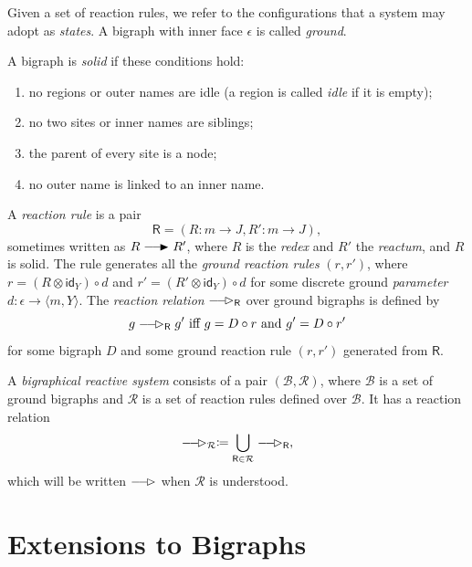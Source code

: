 \documentclass[runningheads]{llncs}
\newcommand\id{\mathsf{id}}
\providecommand\longrightarrowRHD{\relbar\joinrel\relbar\joinrel\mathrel\RHD}
\providecommand\longrightarrowrhd{\relbar\joinrel\relbar\joinrel\mathrel\rhd}
\begin{document}
Given a set of reaction rules, we refer to the configurations that a system may
adopt as \emph{states}. A bigraph with inner face $\epsilon$ is called
\emph{ground}.

\begin{definition}
  A bigraph is \emph{solid} if these conditions hold:
  \begin{enumerate}
  \item no regions or outer names are idle (a region is called \emph{idle}
    if it is empty);
  \item no two sites or inner names are siblings;
  \item the parent of every site is a node;
  \item no outer name is linked to an inner name.
  \end{enumerate}
\end{definition}

\begin{definition} \label{reaction_rule}
  A \emph{reaction rule} is a pair
  \[ \mathsf{R} = (R : m \to J, R' : m \to J), \]
  sometimes written as $R \longrightarrowRHD R'$, where $R$ is the \emph{redex}
  and $R'$ the \emph{reactum}, and $R$ is solid. The rule generates all the
  \emph{ground reaction rules} $(r, r')$, where $r = (R \otimes \id_Y) \circ d$
  and $r' = (R' \otimes \id_Y) \circ d$ for some discrete ground
  \emph{parameter} $d : \epsilon \to \langle m, Y \rangle$. The \emph{reaction
    relation} $\longrightarrowrhd_{\mathsf{R}}$ over ground bigraphs is defined
  by
  \[ g \longrightarrowrhd_{\mathsf{R}} g' \text{ iff } g = D \circ r \text{ and
    } g' = D \circ r' \]
  for some bigraph $D$ and some ground reaction rule $(r, r')$ generated from
  $\mathsf{R}$.
\end{definition}

\begin{definition}
  A \emph{bigraphical reactive system} consists of a pair $(\mathcal{B},
  \mathcal{R})$, where $\mathcal{B}$ is a set of ground bigraphs and
  $\mathcal{R}$ is a set of reaction rules defined over $\mathcal{B}$. It has a
  reaction relation
  \[ \longrightarrowrhd_{\mathcal{R}} \coloneqq \bigcup_{\mathsf{R} \in
      \mathcal{R}} \longrightarrowrhd_{\mathsf{R}}, \]
  which will be written $\longrightarrowrhd$ when $\mathcal{R}$ is understood.
\end{definition}

\section{Extensions to Bigraphs}
\end{document}
